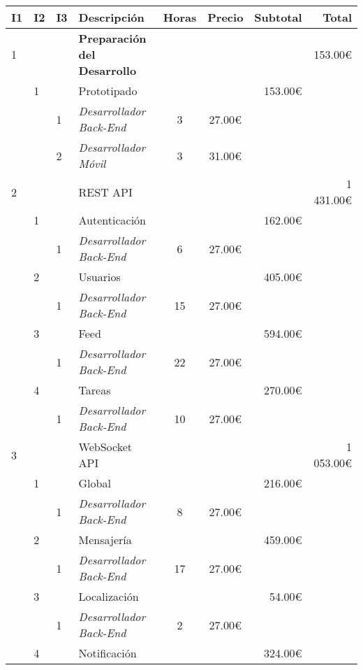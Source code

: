 \begin{longtable}{ l l l l c c r r }
    \hline
    I1 & I2 & I3 & Descripción & Horas & Precio & Subtotal & Total \\
    \hline
    1 & & & \textbf{Preparación del Desarrollo}     & & & & 153.00€ \\
    & 1 & & Prototipado                             & & & 153.00€   & \\
    & & 1 & \emph{Desarrollador Back-End}           & 3 & 27.00€ &  & \\
    & & 2 & \emph{Desarrollador Móvil}              & 3 & 31.00€ &  & \\
    2 & & & REST API                                & & & & 1 431.00€ \\
    & 1 & & Autenticación                           & & & 162.00€   & \\
    & & 1 & \emph{Desarrollador Back-End}           & 6 & 27.00€ &  & \\
    & 2 & & Usuarios                                & & & 405.00€   & \\
    & & 1 & \emph{Desarrollador Back-End}           & 15 & 27.00€ &  & \\
    & 3 & & Feed                                    & & & 594.00€   & \\
    & & 1 & \emph{Desarrollador Back-End}           & 22 & 27.00€ &  & \\
    & 4 & & Tareas                                  & & & 270.00€   & \\
    & & 1 & \emph{Desarrollador Back-End}           & 10 & 27.00€ &  & \\
    3 & & & WebSocket API                           & & & & 1 053.00€    \\
    & 1 & & Global                                  & & & 216.00€   & \\
    & & 1 & \emph{Desarrollador Back-End}           & 8 & 27.00€ &  & \\
    & 2 & & Mensajería                              & & & 459.00€   & \\
    & & 1 & \emph{Desarrollador Back-End}           & 17 & 27.00€ &  & \\
    & 3 & & Localización                            & & & 54.00€   & \\
    & & 1 & \emph{Desarrollador Back-End}           & 2 & 27.00€ &  & \\
    & 4 & & Notificación                            & & & 324.00€   & \\

\end{longtable}
